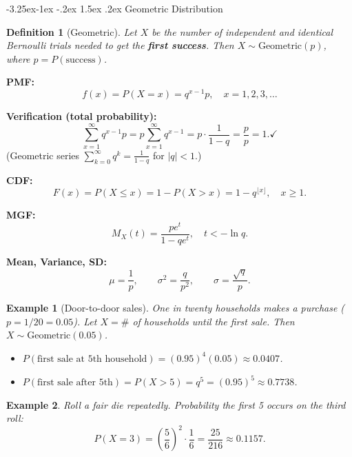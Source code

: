 \documentclass{article}
\makeatletter
\newtheorem{definition}[theorem]{Definition}
\newtheorem{example}{Example}[section]
\theoremstyle{remark}
\newlength{\subsecindent}
\renewcommand\subsection{\@startsection{subsection}{2}{\subsecindent}%
  {-3.25ex\@plus -1ex \@minus -.2ex}%
  {1.5ex \@plus .2ex}%
  {\normalfont\large\bfseries}}
\newenvironment{sub}{%
  \begin{list}{}{%
    \setlength{\leftmargin}{4em}%
    \setlength{\rightmargin}{0pt}%
    \setlength{\topsep}{0pt}%
    \setlength{\partopsep}{0pt}%
    \setlength{\parsep}{\parskip}%
    \setlength{\itemsep}{\parskip}%
  }\item\relax
}{\end{list}}
\makeatother
\begin{document}
\subsection{Geometric Distribution}
\begin{sub}

\begin{definition}[Geometric]
  Let $X$ be the number of independent and identical Bernoulli trials
  needed to get the \textbf{first success}. Then $X \sim \text{Geometric}(p)$,
  where $p = P(\text{success})$.
\end{definition}

\textbf{PMF:}
\begin{equation}
  f(x) = P(X = x) = q^{x-1} p, \quad x = 1, 2, 3, \ldots
  \label{eq:geo-pmf}
\end{equation}

\textbf{Verification (total probability):}
\[
  \sum_{x=1}^{\infty} q^{x-1} p = p \sum_{x=1}^{\infty} q^{x-1}
  = p \cdot \frac{1}{1-q} = \frac{p}{p} = 1. \checkmark
\]
(Geometric series $\sum_{k=0}^{\infty} q^k = \frac{1}{1-q}$ for $|q| < 1$.)

\textbf{CDF:}
\begin{equation}
  F(x) = P(X \le x) = 1 - P(X > x) = 1 - q^{\lfloor x \rfloor}, \quad x \ge 1.
  \label{eq:geo-cdf}
\end{equation}

\textbf{MGF:}
\begin{equation}
  M_X(t) = \frac{pe^t}{1 - qe^t}, \quad t < -\ln q.
  \label{eq:geo-mgf}
\end{equation}

\textbf{Mean, Variance, SD:}
\begin{equation}
  \mu = \frac{1}{p}, \qquad \sigma^2 = \frac{q}{p^2}, \qquad \sigma = \frac{\sqrt{q}}{p}.
  \label{eq:geo-params}
\end{equation}

\begin{example}[Door-to-door sales]
  \label{ex:geo-cookies}
  One in twenty households makes a purchase ($p = 1/20 = 0.05$).
  Let $X = \#$ of households until the first sale. Then $X \sim \text{Geometric}(0.05)$.
  \begin{itemize}
    \item $P(\text{first sale at 5th household}) = (0.95)^4(0.05) \approx 0.0407$.
    \item $P(\text{first sale after 5th}) = P(X > 5) = q^5 = (0.95)^5 \approx 0.7738$.
  \end{itemize}
\end{example}

\begin{example}
  Roll a fair die repeatedly. Probability the first 5 occurs on the third roll:
  \[
    P(X = 3) = \left(\frac{5}{6}\right)^2 \cdot \frac{1}{6} = \frac{25}{216} \approx 0.1157.
  \]
\end{example}

\end{sub}
\end{document}
